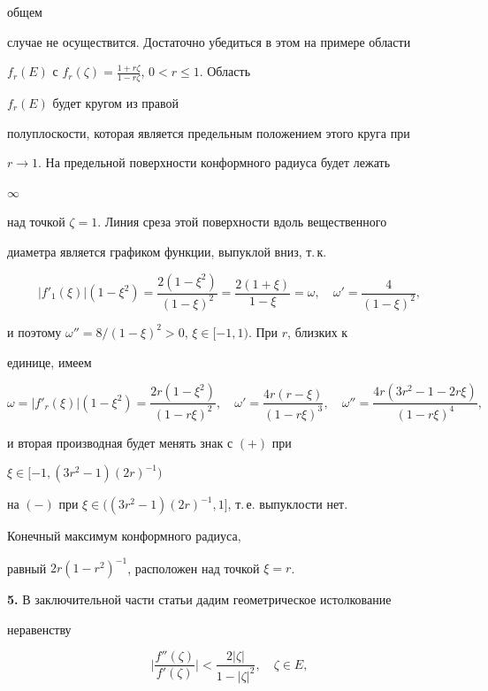 \begin{pf}
общем 


случае не осуществится. Достаточно убедиться в этом на примере области 


$f_r(E)$ с $f_r(\zeta)=\frac{1+r\zeta}{1-r\zeta}$, $0<r\le1$. Область 


$f_r(E)$ будет кругом из правой 


полуплоскости, которая является предельным положением этого круга при 


$r\to1$. На предельной поверхности конформного радиуса будет лежать 


$\infty$ 


над точкой $\zeta=1$. Линия среза этой поверхности вдоль вещественного 


диаметра является графиком функции, выпуклой вниз, т.\,к. 


$$ 


|f'_1(\xi)|(1-\xi^2)=\frac{2(1-\xi^2)}{(1-\xi)^2}= 


\frac{2(1+\xi)}{1-\xi}=\omega,\quad 


\omega'=\frac{4}{(1-\xi)^2}, 


$$ 


и поэтому $\omega''=8/(1-\xi)^2>0$, $\xi\in[-1,1)$. При $r$, близких к 


единице, имеем 


$$ 


\omega=|f'_r(\xi)|(1-\xi^2)=\frac{2r(1-\xi^2)}{(1-r\xi)^2},\quad 


\omega'=\frac{4r(r-\xi)}{(1-r\xi)^3},\quad 


\omega''=\frac{4r(3r^2-1-2r\xi)}{(1-r\xi)^4}, 


$$ 


и вторая производная будет менять знак с $(+)$ при 


$\xi\in[-1,(3r^2-1)(2r)^{-1})$ 


на $(-)$ при $\xi\in((3r^2-1)(2r)^{-1},1]$, т.\,е. выпуклости нет. 


Конечный максимум конформного радиуса, 


равный $2r(1-r^2)^{-1}$, расположен над точкой $\xi=r$. 


\end{pf} 


 


{\bf 5.} В заключительной части статьи дадим геометрическое истолкование 


неравенству 


\begin{equation} 


\bigg|\frac{f''(\zeta)}{f'(\zeta)}\bigg|< 


\frac{2|\zeta|}{1-|\zeta|^2},\quad \zeta\in E, 


\end{equation} 


